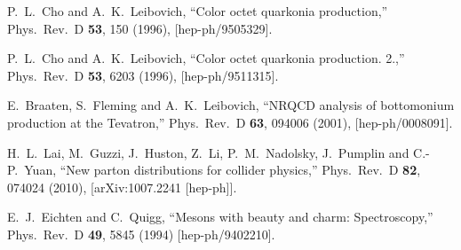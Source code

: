 \documentclass[aps,prc,preprint,superscriptaddress,showpacs,showkeys,amsmath]{revtex4-1}
\begin{document}
\begin{thebibliography}{100}
  P.~L.~Cho and A.~K.~Leibovich,
  ``Color octet quarkonia production,''
  Phys.\ Rev.\ D {\bf 53}, 150 (1996),
  [hep-ph/9505329].

  P.~L.~Cho and A.~K.~Leibovich,
  ``Color octet quarkonia production. 2.,''
  Phys.\ Rev.\ D {\bf 53}, 6203 (1996),
  [hep-ph/9511315].

  E.~Braaten, S.~Fleming and A.~K.~Leibovich,
  ``NRQCD analysis of bottomonium production at the Tevatron,''
  Phys.\ Rev.\ D {\bf 63}, 094006 (2001),
  [hep-ph/0008091].


  H.~L.~Lai, M.~Guzzi, J.~Huston, Z.~Li, P.~M.~Nadolsky, J.~Pumplin and C.-P.~Yuan,
  ``New parton distributions for collider physics,''
  Phys.\ Rev.\ D {\bf 82}, 074024 (2010),
  [arXiv:1007.2241 [hep-ph]].

  E.~J.~Eichten and C.~Quigg,
  ``Mesons with beauty and charm: Spectroscopy,''
  Phys.\ Rev.\ D {\bf 49}, 5845 (1994)
  [hep-ph/9402210].



 




\end{thebibliography}
\end{document}

